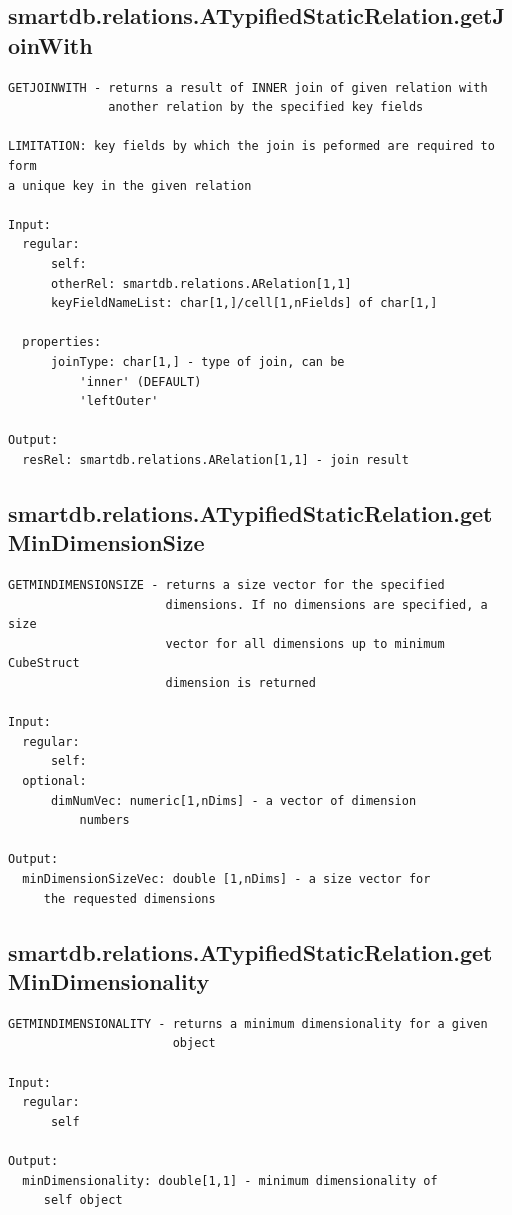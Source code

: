 \documentclass[letterpaper,10pt,english]{sphinxmanual}
\begin{document}
\subsection{smartdb.relations.ATypifiedStaticRelation.getJoinWith}
\label{chap_functions:smartdb-relations-atypifiedstaticrelation-getjoinwith}
\begin{Verbatim}[commandchars=\\\{\}]
GETJOINWITH - returns a result of INNER join of given relation with
              another relation by the specified key fields

LIMITATION: key fields by which the join is peformed are required to form
a unique key in the given relation

Input:
  regular:
      self:
      otherRel: smartdb.relations.ARelation[1,1]
      keyFieldNameList: char[1,]/cell[1,nFields] of char[1,]

  properties:
      joinType: char[1,] - type of join, can be
          'inner' (DEFAULT)
          'leftOuter'

Output:
  resRel: smartdb.relations.ARelation[1,1] - join result
\end{Verbatim}


\subsection{smartdb.relations.ATypifiedStaticRelation.getMinDimensionSize}
\label{chap_functions:smartdb-relations-atypifiedstaticrelation-getmindimensionsize}
\begin{Verbatim}[commandchars=\\\{\}]
GETMINDIMENSIONSIZE - returns a size vector for the specified
                      dimensions. If no dimensions are specified, a size
                      vector for all dimensions up to minimum CubeStruct
                      dimension is returned

Input:
  regular:
      self:
  optional:
      dimNumVec: numeric[1,nDims] - a vector of dimension
          numbers

Output:
  minDimensionSizeVec: double [1,nDims] - a size vector for
     the requested dimensions
\end{Verbatim}


\subsection{smartdb.relations.ATypifiedStaticRelation.getMinDimensionality}
\label{chap_functions:smartdb-relations-atypifiedstaticrelation-getmindimensionality}
\begin{Verbatim}[commandchars=\\\{\}]
GETMINDIMENSIONALITY - returns a minimum dimensionality for a given
                       object

Input:
  regular:
      self

Output:
  minDimensionality: double[1,1] - minimum dimensionality of
     self object
\end{Verbatim}
\end{document}
